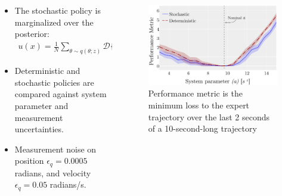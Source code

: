\begin{frame}
    \small
    \begin{columns}
        \begin{column}{0.4\linewidth}
            \begin{itemize}
                \item The stochastic policy is marginalized over the posterior: 
                \begin{align*}
                    u(x) = \frac{1}{N}\sum_{\theta \sim q(\theta; z)} \mathcal{D}\{F(x; \theta) \}.
                \end{align*}
                \item Deterministic and stochastic policies are compared against
                system parameter and measurement uncertainties.
                \item Measurement noise on position $\epsilon_q= 0.0005$ radians, and velocity $\epsilon_{\dot{q}}= 0.05$ radians/s.
            \end{itemize}
        \end{column}
        \begin{column}{0.6\linewidth}
            \begin{figure}
                \centering
                \includegraphics[width=1.0\linewidth]{figures/H.eps}
                \caption{\small Performance metric is the minimum loss to the expert trajectory over the last 2 seconds of a 10-second-long trajectory}
            \end{figure}
        \end{column}
    \end{columns}
\end{frame}

